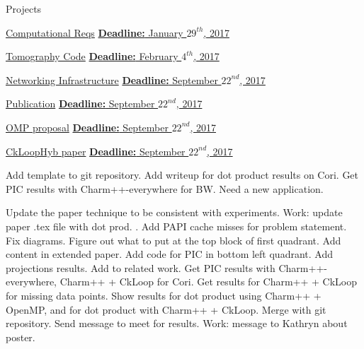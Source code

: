 \begin{columns}  %
\begin{column}{0.10\linewidth}

\begin{block}{Projects}


\underline{Computational Reqs} 
\underline{\textbf{Deadline:} January $29^{th}$, 2017} 
\begin{enumerate}
\pitem 
\pitem 
\end{enumerate}

\underline{Tomography Code} 
\underline{\textbf{Deadline:} February $4^{th}$, 2017} 
\begin{enumerate}
\pitem 
\pitem 
\end{enumerate} 

\underline{Networking Infrastructure} 
\underline{\textbf{Deadline:} September $22^{nd}$, 2017} 
\begin{enumerate}
\pitem 
\pitem 
\end{enumerate} 

\underline{Publication} 
\underline{\textbf{Deadline:} September $22^{nd}$, 2017} 
\begin{enumerate}
\pitem 
\pitem 
\end{enumerate}



\underline{OMP proposal} 
\underline{\textbf{Deadline:} September $22^{nd}$, 2017} 
\begin{enumerate}
\pitem 
\pitem 
\end{enumerate}

\underline{CkLoopHyb paper}
\underline{\textbf{Deadline:} September $22^{nd}$, 2017}
\begin{enumerate}
\pitem Add template to git repository.
\pitem Add writeup for dot product results on Cori.
\pitem Get PIC results with Charm++-everywhere for BW.
\pitem Need a new application. 

\ptask Update the paper technique to be consistent with experiments.  
\ptask Work: update paper .tex file with dot prod. .
\ptask Add PAPI cache misses for problem statement.
\ptask Fix diagrams.
\ptask Figure out what to put at the top block of first quadrant.
\ptask Add content in extended paper.
\ptask Add code for PIC in bottom left quadrant.
\ptask Add projections results.
\ptask Add to related work.
\ptask Get PIC results with Charm++-everywhere, Charm++ + CkLoop for Cori.
\ptask Get results for Charm++ + CkLoop for missing data points.
\ptask Show results for dot product using Charm++ + OpenMP, and for
dot product with Charm++ + CkLoop.
\pitem Merge with git repository.
\pitem Send message to meet for results.
\pitem Work: message to Kathryn about poster.
\end{enumerate}


\end{block}
\end{column}
\end{columns}
